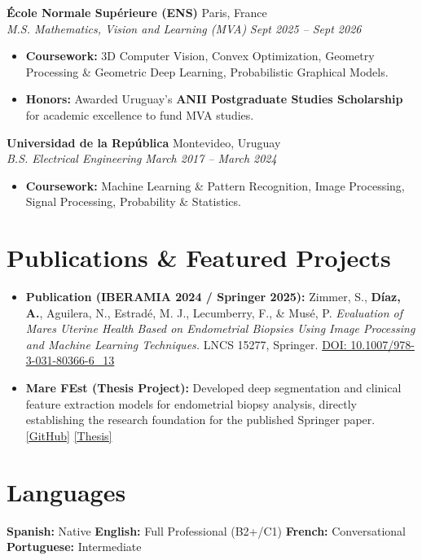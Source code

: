\documentclass[10pt, a4paper]{article}
\newcommand{\entryheader}[4]{
    \noindent \textbf{#1} \hfill #2 \\
    \textit{#3} \hfill \textit{#4} \vspace{0pt}
}
\begin{document}
\entryheader{École Normale Supérieure (ENS)}{Paris, France}{M.S. Mathematics, Vision and Learning (MVA)}{Sept 2025 -- Sept 2026}
\begin{itemize}
    \item \textbf{Coursework:} 3D Computer Vision, Convex Optimization, Geometry Processing \& Geometric Deep Learning, Probabilistic Graphical Models.
    \item \textbf{Honors:} Awarded Uruguay's \textbf{ANII Postgraduate Studies Scholarship} for academic excellence to fund MVA studies.
\end{itemize}
\vspace{3pt}

\entryheader{Universidad de la República}{Montevideo, Uruguay}{B.S. Electrical Engineering}{March 2017 -- March 2024}
\begin{itemize}
    \item \textbf{Coursework:} Machine Learning \& Pattern Recognition, Image Processing, Signal Processing, Probability \& Statistics.
\end{itemize}

\section{Publications \& Featured Projects}
\begin{itemize}
    \item \textbf{Publication (IBERAMIA 2024 / Springer 2025):} Zimmer, S., \textbf{Díaz, A.}, Aguilera, N., Estradé, M. J., Lecumberry, F., \& Musé, P. \textit{Evaluation of Mares Uterine Health Based on Endometrial Biopsies Using Image Processing and Machine Learning Techniques.} LNCS 15277, Springer. \href{https://doi.org/10.1007/978-3-031-80366-6_13}{DOI: 10.1007/978-3-031-80366-6\_13}
    \item \textbf{Mare FEst (Thesis Project):} Developed deep segmentation and clinical feature extraction models for endometrial biopsy analysis, directly establishing the research foundation for the published Springer paper. \href{https://github.com/Peregalli/MareFEst}{[GitHub]} \textbar{} \href{https://hdl.handle.net/20.500.12008/43668}{[Thesis]}
\end{itemize}

\section{Languages}
\textbf{Spanish:} Native \quad \textbar{} \quad \textbf{English:} Full Professional (B2+/C1) \quad \textbar{} \quad \textbf{French:} Conversational \quad \textbar{} \quad \textbf{Portuguese:} Intermediate
\end{document}
